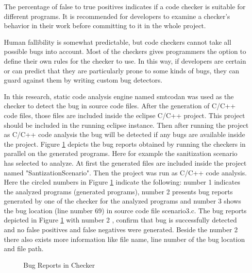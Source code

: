 The percentage of false to true positives indicates if a code checker is suitable for different programs. It is recommended for developers to examine a checker's behavior in their work before committing to it in the whole project. 

Human fallibility is somewhat predictable, but code checkers cannot take all possible bugs into account. Most of the checkers gives programmers the option to define their own rules for the checker to use. In this way, if developers are certain or can predict that they
are particularly prone to some kinds of bugs, they can guard against them by writing custom bug detectors. 

In this research, static code analysis engine named smtcodan was used as the checker to detect the bug in source code files. After the generation of C/C++ code files, those files are included inside the eclipse C/C++ project. This project should be included in the running eclipse instance. Then after running the project as C/C++ code analysis the bug will be detected if any bugs are available inside the project. Figure \ref{bugDetection} depicts the bug reports obtained by running the checkers in parallel on the generated programs. Here for example the sanitization scenario has selected to analyze. At first the generated files are included inside the project named "SantizationScenario". Then the project was run as C/C++ code analysis. Here the circled numbers in Figure \ref{bugDetection} indicate the following: number 1 indicates the analyzed programs (generated programs), number
2 presents bug reports generated by one of the checker for the analyzed programs and number 3 shows the
bug location (line number 69) in source code file scenario3.c. The bug reports depicted in Figure \ref{bugDetection} with number
2 , confirm that bug is successfully detected and no
false positives and false negatives were generated. Beside the number 2 there also exists more information like file name, line number of the bug location and file path. 

\begin{figure}[htbp]
	\centering
	\label{bugDetection}
	\caption{Bug Reports in Checker}
\end{figure}

